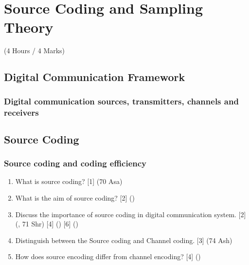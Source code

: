 \documentclass[12pt]{article}
\begin{document}
\pagebreak

\section{Source Coding and Sampling Theory}
  \begin{center}(4 Hours / 4 Marks)\end{center}

  \subsection{Digital Communication Framework}
    \subsubsection{Digital communication sources, transmitters, channels and receivers}
  \subsection{Source Coding}
    \subsubsection{Source coding and coding efficiency}
      \begin{enumerate}
      	\item What is source coding? \hfill [1] (70 Asa)
      	
      	\item What is the aim of source coding? \hfill [2] ()
        
        \item Discuss the importance of source coding in digital communication system. \hfill [2] (, 71 Shr) [4] () [6] ()
        
        \item Distinguish between the Source coding and Channel coding. \hfill [3] (74 Ash)
        
        \item How does source encoding differ from channel encoding? \hfill [4] ()
      \end{enumerate}
\end{document}
